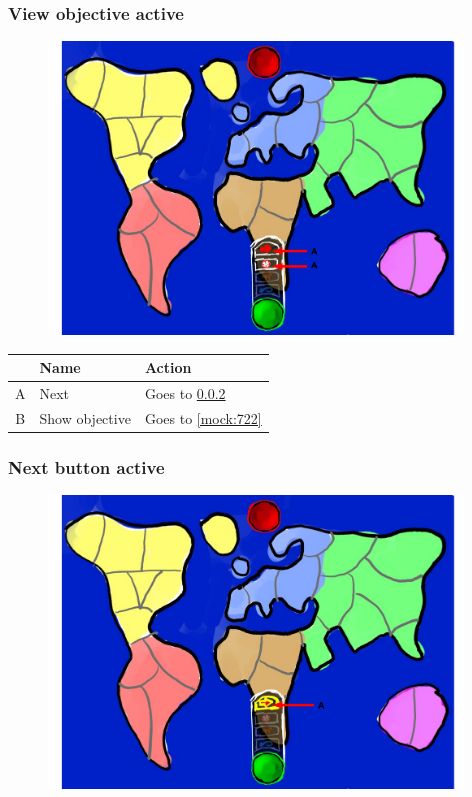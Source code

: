 \documentclass[12pt,a4paper]{article}
\begin{document}
\newpage
\subsubsection{View objective active}\label{mock:733}

\begin{figure}[H]
  \centering
  \includegraphics[width=11cm]{pic/mocks/3-3.pdf}
\end{figure}

\begin{table}[H]
\small
\centering
\begin{tabular}{c|p{5cm}|p{7cm}}
& Name & Action \\ \hline\hline
A
&Next
&Goes to \ref{mock:734}
\\B
&Show objective
&Goes to \ref{mock:722}
\end{tabular}
\end{table}

\subsubsection{Next button active}\label{mock:734}

\begin{figure}[H]
  \centering
  \includegraphics[width=11cm]{pic/mocks/3-4.pdf}
\end{figure}
\end{document}
